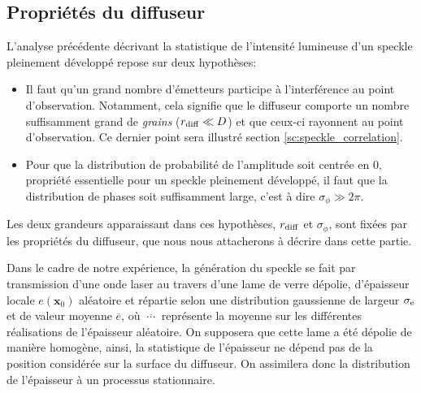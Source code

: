 \subsection{Propriétés du diffuseur}
\label{sc:prop_diffuseur}
L'analyse précédente décrivant la statistique de l'intensité lumineuse d'un speckle pleinement développé repose sur deux hypothèses: 
\begin{itemize}
\item[\textendash] Il faut qu'un grand nombre d'émetteurs participe à l'interférence au point d'observation. Notamment, cela signifie que le diffuseur comporte un nombre suffisamment grand de \emph{grains} ($r_{\mathrm{diff}} \ll D$)  et que ceux-ci rayonnent au point d'observation. Ce dernier point sera illustré section \ref{sc:speckle_correlation}.
\item[\textendash] Pour que la distribution de probabilité de l'amplitude soit centrée en 0, propriété essentielle pour un speckle pleinement développé, il faut que la distribution de phases soit suffisamment large, c'est à dire $\sigma_\phi \gg 2\pi$. 
\end{itemize}
Les deux grandeurs apparaissant dans ces hypothèses, $r_{\mathrm{diff}}$ et $\sigma_\phi$, sont fixées par les propriétés du diffuseur, que nous nous attacherons à décrire dans cette partie.

Dans le cadre de notre expérience, la génération du speckle se fait par transmission d'une onde laser au travers d'une lame de verre dépolie, d'épaisseur locale $e(\mathbf{x}_0)$ aléatoire et répartie selon une distribution gaussienne de largeur $\sigma_{\mathrm{e}}$ et de valeur moyenne $\overline{e}$, où $\overline{\:\cdots\:}$ représente la moyenne sur les différentes réalisations de l'épaisseur aléatoire. On supposera que cette lame a été dépolie de manière homogène, ainsi, la statistique de l'épaisseur ne dépend pas de la position considérée sur la surface du diffuseur. On assimilera donc la distribution de l'épaisseur à un processus stationnaire. 

